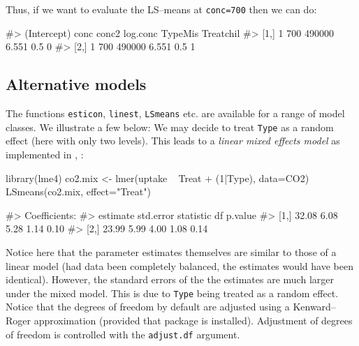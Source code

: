 Thus, if we want to evaluate the LS--means at \texttt{conc=700} then we
can do:

\begin{Schunk}
\begin{Soutput}
#>      (Intercept) conc  conc2 log.conc TypeMis Treatchil
#> [1,]           1  700 490000    6.551     0.5         0
#> [2,]           1  700 490000    6.551     0.5         1
\end{Soutput}
\end{Schunk}

\hypertarget{alternative-models}{%
\subsection{Alternative models}\label{alternative-models}}

The functions \texttt{esticon}, \texttt{linest}, \texttt{LSmeans} etc.
are available for a range of model classes. We illustrate a few below:
We may decide to treat \verb|Type| as a random effect (here with only
two levels). This leads to a \emph{linear mixed effects model} as
implemented in , \citep{lme4}:

\begin{Schunk}
\begin{Sinput}
library(lme4)
co2.mix <- lmer(uptake ~ Treat + (1|Type), data=CO2)
LSmeans(co2.mix, effect="Treat")
\end{Sinput}
\begin{Soutput}
#> Coefficients:
#>      estimate std.error statistic    df p.value
#> [1,]    32.08      6.08      5.28  1.14    0.10
#> [2,]    23.99      5.99      4.00  1.08    0.14
\end{Soutput}
\end{Schunk}

Notice here that the parameter estimates themselves are similar to those
of a linear model (had data been completely balanced, the estimates
would have been identical). However, the standard errors of the the
estimates are much larger under the mixed model. This is due to
\texttt{Type} being treated as a random effect. Notice that the degrees
of freedom by default are adjusted using a Kenward--Roger approximation
(provided that  package \citep{pbkrtest} is
installed). Adjustment of degrees of freedom is controlled with the
\texttt{adjust.df} argument.

